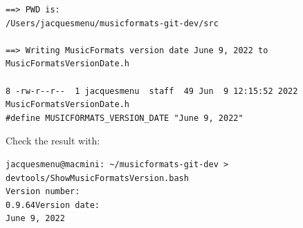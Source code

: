 \begin{enumerate}
\begin{lstlisting}[language=Terminal]
==> PWD is:
/Users/jacquesmenu/musicformats-git-dev/src

==> Writing MusicFormats version date June 9, 2022 to MusicFormatsVersionDate.h

8 -rw-r--r--  1 jacquesmenu  staff  49 Jun  9 12:15:52 2022 MusicFormatsVersionDate.h
#define MUSICFORMATS_VERSION_DATE "June 9, 2022"
\end{lstlisting}


Check the result with:
\begin{lstlisting}[language=Terminal]
jacquesmenu@macmini: ~/musicformats-git-dev > devtools/ShowMusicFormatsVersion.bash
Version number:
0.9.64Version date:
June 9, 2022
\end{lstlisting}

\end{enumerate}



%
%
%
%
%
%
%
%
%
%
%


